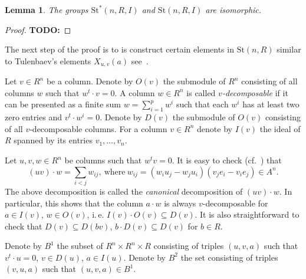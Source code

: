 \documentclass[oneside,12pt]{amsart}
\numberwithin{equation}{section}
\newtheorem{lem}{Lemma}
\numberwithin{lem}{section}
\theoremstyle{definition}
\theoremstyle{remark}
\newcommand{\Stb}{\mathrm{St}}
\begin{document}
\begin{appendices}
\begin{lem}
 The groups $\Stb^*(n, R, I)$ and $\Stb(n, R, I)$ are isomorphic.
\end{lem}
\begin{proof}
 {\bf TODO:}
\end{proof}

The next step of the proof is to is construct certain elements in $\Stb(n, R)$ similar to Tulenbaev's elements $X_{u,v}(a)$ see~\cite[\S~1]{Tu}.

Let $v\in R^n$ be a column.
Denote by $O(v)$ the submodule of $R^n$ consisting of all columns $w$ such that $w^t \cdot v = 0$.
A column $w\in R^n$ is called \emph{$v$-decomposable} if it can be presented as a finite sum $w = \sum\limits_{i=1}^p w^i$ such that each $w^i$ has at least two zero entries and $v^t \cdot w^i = 0$.
Denote by $D(v)$ the submodule of $O(v)$ consisting of all $v$-decomposable columns.
For a column $v\in R^n$ denote by $I(v)$ the ideal of $R$ spanned by its entries $v_1,\ldots, v_n$.

Let $u,v,w\in R^n$ be columns such that $w^tv=0$.
It is easy to check (cf.~\cite[Lemma~3.2]{Ka}) that
$$(uv)\cdot w = \sum_{i<j}w_{ij},\ \text{where}\ w_{ij} = (w_iu_j - w_ju_i)(v_je_i - v_ie_j)\in{}\!A^n.$$
The above decomposition is called the \emph{canonical} decomposition of $(uv)\cdot w$.
In particular, this shows that the column $a\cdot w$ is always $v$-decomposable for $a\in I(v)$, $w \in O(v)$, i.\,e. $I(v) \cdot O(v) \subseteq D(v)$.
It is also straightforward to check that $D(v)\subseteq D(bv)$, $b \cdot D(v) \subseteq D(v)$ for $b \in R$.

Denote by $B^1$ the subset of $R^n \times R^n \times R$ consisting of triples $(u, v, a)$ such that $v^t \cdot u = 0$, $v \in D(u)$, $a \in I(u)$.
Denote by $B^2$ the set consisting of triples $(v, u, a)$ such that $(u, v, a) \in B^1$.


\end{appendices}
\end{document}
